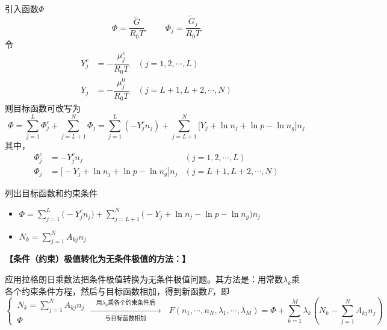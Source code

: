 引入函数$\varPhi$
\begin{equation}
	\varPhi = \dfrac{\tilde{G}}{R_0 T}, \qquad \varPhi_j = \dfrac{\tilde{G}_j}{R_0T}
\end{equation}
令
\begin{align}
	Y_j^c &= - \dfrac{\mu_j^c}{R_0 T}\quad (j = 1, 2, \cdots, L)\\[0.3em]
	Y_j &= - \dfrac{\mu_j^0}{R_0T} \quad (j = L +1, L+2, \cdots, N)
\end{align}
则目标函数可改写为
\begin{equation}
	\varPhi = \sum_{j = 1}^{L}\varPhi_j^c + \sum_{j = L+1}^{N}\varPhi_j = \sum_{j = 1}^{L}(-Y_j^c n_j) + \sum_{j = L +1}^{N}\big[Y_j + \ln n_j + \ln p - \ln n_g\big]n_j
\end{equation}
其中，
\begin{equation}
	\begin{aligned}
		\varPhi_j^c & = - Y_j^c n_j & (j = 1,2,\cdots,L)\\
		\varPhi_j & = \big[-Y_j+\ln n_j + \ln p - \ln n_g\big]n_j & (j = L+1, L+2, \cdots,N)
	\end{aligned}
\end{equation}
\clearpage

\sssection[目标函数条件极值的解法]

列出目标函数和约束条件
\begin{itemize}
	\item \red[目标函数]\quad $\displaystyle \varPhi = \sum_{j = 1}^{L} \big(-Y_j^cn_j\big) + \sum_{j = L +1}^{N}\big(-Y_j + \ln n_j - \ln p - \ln n_g\big)n_j$\vspace*{-0.5em}
	\item \red[约束条件]\quad $\displaystyle N_k = \sum_{j = 1}^{N} A_{kj}n_j$
\end{itemize}

\noindent \textbf{【条件（约束）极值转化为无条件极值的方法：】}

应用拉格朗日乘数法把条件极值转换为无条件极值问题。其方法是：用常数$\lambda_k$乘各个约束条件方程，然后与目标函数相加，得到新函数$F$，即
\begin{equation}
	\begin{cases}
		\, \displaystyle N_k = \sum_{j = 1}^{N} A_{kj}n_j\\
		\, \varPhi
	\end{cases}
	 \xrightarrow[\mbox{与目标函数相加}]{\quad \textstyle \mbox{用}\lambda_k\mbox{乘各个约束条件后} \quad }\,\,\,\, F(n_1,\cdots,n_N, \lambda_1,\cdots,\lambda_M) = \varPhi + \sum_{k = 1}^{M}\lambda_k \left(N_k - \sum_{j = 1}^{N}A_{kj}n_j\right)
\end{equation}

